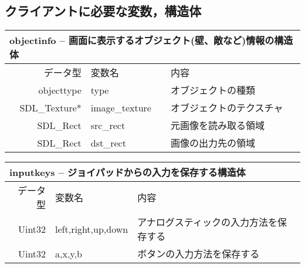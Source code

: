 \documentclass{jarticle}
\begin{document}
\subsection{クライアントに必要な変数，構造体}
\begin{table}[H]
\begin{tabular}{|r|l|l|}
\hline
\multicolumn{3}{|l|}{objectinfo -- 画面に表示するオブジェクト(壁、敵など)情報の構造体}       \\ \hline
データ型      & 変数名    & 内容        \\ \hline
objecttype    & type & オブジェクトの種類  \\
SDL\_Texture* & image\_texture     & オブジェクトのテクスチャ \\
SDL\_Rect & src\_rect & 元画像を読み取る領域 \\
SDL\_Rect & dst\_rect & 画像の出力先の領域 \\ \hline
\end{tabular}
\end{table}

\begin{table}[H]
\begin{tabular}{|r|l|l|}
\hline
\multicolumn{3}{|l|}{inputkeys -- ジョイパッドからの入力を保存する構造体}       \\ \hline
データ型      & 変数名    & 内容        \\ \hline
Uint32    & left,right,up,down & アナログスティックの入力方法を保存する \\
Uint32    & a,x,y,b & ボタンの入力方法を保存する \\
\end{tabular}
\end{table}
\end{document}
